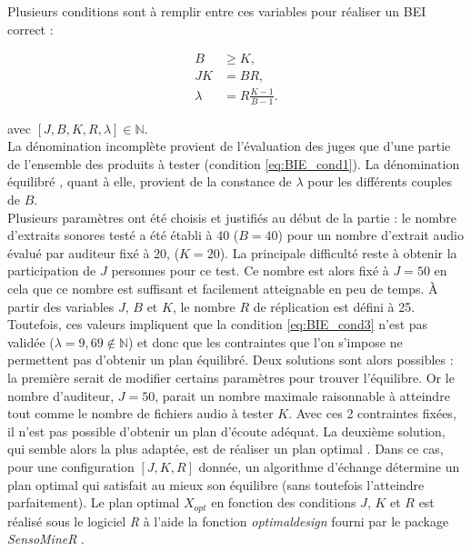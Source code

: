 Plusieurs conditions sont à remplir entre ces variables pour réaliser un BEI correct :

\begin{subequations}\label{BIE_cond}
\begin{align}
B &\geq K, \label{eq:BIE_cond1}\\
JK &= BR, \label{eq:BIE_cond2}\\
\lambda &= R\frac{K-1}{B-1}. \label{eq:BIE_cond3}
\end{align}
\end{subequations}

avec $\left[J, B, K, R, \lambda\right] \in \mathbb{N}$.\\

La dénomination \og incomplète \fg{} provient de l'évaluation des juges que d'une partie de l'ensemble des produits à tester (condition \ref{eq:BIE_cond1}). La dénomination \og équilibré \fg{}, quant à elle, provient de la constance de $\lambda$ pour les différents couples de $B$. \\

Plusieurs paramètres ont été choisis et justifiés au début de la partie : le nombre d'extraits sonores testé a été établi à 40 ($B = 40$) pour un nombre d'extrait audio évalué par auditeur fixé à 20, ($K = 20$). La principale difficulté reste à obtenir la participation de $J$ personnes pour ce test. Ce nombre est alors fixé à $J = 50$ en cela que ce nombre est suffisant et facilement atteignable en peu de temps. À partir des variables $J$, $B$ et $K$, le nombre $R$ de réplication est défini à 25. Toutefois, ces valeurs impliquent que la condition \ref{eq:BIE_cond3} n'est pas validée ($\lambda = 9,69 \notin \mathbb{N}$) et donc que les contraintes que l'on s'impose ne permettent pas d'obtenir un plan équilibré. Deux solutions sont alors possibles : la première serait de modifier certains paramètres pour trouver l'équilibre. Or le nombre d'auditeur, $J = 50$, parait un nombre maximale raisonnable à atteindre tout comme le nombre de fichiers audio à tester $K$. Avec ces 2 contraintes fixées, il n'est pas possible d'obtenir un plan d'écoute adéquat. La deuxième solution, qui semble alors la plus adaptée, est de réaliser un plan optimal \cite{pages_blocs_2007}. Dans ce cas, pour une configuration $\left[J, K, R\right]$ donnée, un algorithme d'échange détermine un \og plan optimal \fg{} qui satisfait au mieux son équilibre (sans toutefois l'atteindre parfaitement). Le plan optimal $X_{opt}$ en fonction des conditions $J$, $K$ et $R$ est réalisé sous le logiciel \textit{R} à l'aide la fonction \textit{optimaldesign} fourni par le package \textit{SensoMineR} \cite{le_sensominer_2008}.

